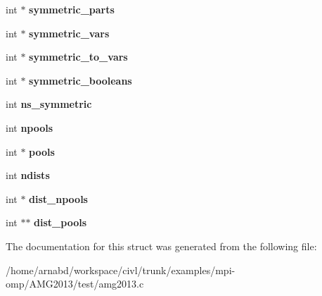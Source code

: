 \begin{DoxyCompactItemize}
\item 
\hypertarget{structProblemData_a0d39a51c5fcbb146d524b39615cbfaf4}{}int $\ast$ {\bfseries symmetric\+\_\+parts}\label{structProblemData_a0d39a51c5fcbb146d524b39615cbfaf4}

\item 
\hypertarget{structProblemData_a282398b53dbc744f0b25459bfd327e92}{}int $\ast$ {\bfseries symmetric\+\_\+vars}\label{structProblemData_a282398b53dbc744f0b25459bfd327e92}

\item 
\hypertarget{structProblemData_ae281d802a56d7204e1cc14ba73897acc}{}int $\ast$ {\bfseries symmetric\+\_\+to\+\_\+vars}\label{structProblemData_ae281d802a56d7204e1cc14ba73897acc}

\item 
\hypertarget{structProblemData_a0a75c9ca8d109c9af0d21767cb57bac3}{}int $\ast$ {\bfseries symmetric\+\_\+booleans}\label{structProblemData_a0a75c9ca8d109c9af0d21767cb57bac3}

\item 
\hypertarget{structProblemData_aab0e6562265ad82ac84058ee82aedaa4}{}int {\bfseries ns\+\_\+symmetric}\label{structProblemData_aab0e6562265ad82ac84058ee82aedaa4}

\item 
\hypertarget{structProblemData_a8417b42466c56f28609f2569e155eee4}{}int {\bfseries npools}\label{structProblemData_a8417b42466c56f28609f2569e155eee4}

\item 
\hypertarget{structProblemData_a0d8da422a19408320822d0ad28e966c5}{}int $\ast$ {\bfseries pools}\label{structProblemData_a0d8da422a19408320822d0ad28e966c5}

\item 
\hypertarget{structProblemData_a285f3cc5dd2ae92caf4dd43671fff362}{}int {\bfseries ndists}\label{structProblemData_a285f3cc5dd2ae92caf4dd43671fff362}

\item 
\hypertarget{structProblemData_ae290001abe362a6a845e05ea3489064a}{}int $\ast$ {\bfseries dist\+\_\+npools}\label{structProblemData_ae290001abe362a6a845e05ea3489064a}

\item 
\hypertarget{structProblemData_a0a47197e90059084514da9dcc1bd47eb}{}int $\ast$$\ast$ {\bfseries dist\+\_\+pools}\label{structProblemData_a0a47197e90059084514da9dcc1bd47eb}

\end{DoxyCompactItemize}


The documentation for this struct was generated from the following file\+:\begin{DoxyCompactItemize}
\item 
/home/arnabd/workspace/civl/trunk/examples/mpi-\/omp/\+A\+M\+G2013/test/amg2013.\+c\end{DoxyCompactItemize}
